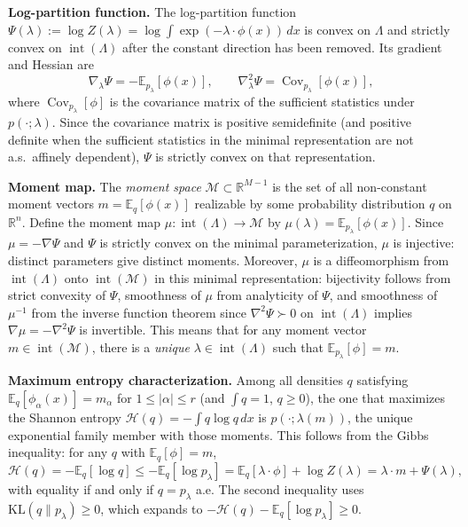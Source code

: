 \documentclass{article}
\newcommand{\R}{\mathbb{R}}
\newcommand{\E}{\mathbb{E}}
\theoremstyle{definition}
\begin{document}
\textbf{Log-partition function.}
The log-partition function $\Psi(\lambda) := \log Z(\lambda)
= \log \int \exp(-\lambda\cdot\phi(x))\,dx$ is convex on $\Lambda$
and strictly convex on $\operatorname{int}(\Lambda)$ after the constant
direction has been removed.
Its gradient and Hessian are
\begin{equation}
    \nabla_\lambda \Psi = -\E_{p_\lambda}[\phi(x)],
    \qquad
    \nabla^2_\lambda \Psi = \operatorname{Cov}_{p_\lambda}[\phi(x)],
\end{equation}
where $\operatorname{Cov}_{p_\lambda}[\phi]$ is the covariance matrix
of the sufficient statistics under $p(\cdot;\lambda)$.
Since the covariance matrix is positive semidefinite (and positive definite
when the sufficient statistics in the minimal representation are not
a.s.\ affinely dependent), $\Psi$ is strictly convex on that representation.

\textbf{Moment map.}
The \emph{moment space} $\mathcal{M} \subset \R^{M-1}$ is the set of all non-constant moment vectors $m = \E_q[\phi(x)]$ realizable by some probability distribution $q$ on $\R^n$.
Define the moment map $\mu \colon \operatorname{int}(\Lambda) \to \mathcal{M}$
by $\mu(\lambda) = \E_{p_\lambda}[\phi(x)]$.
Since $\mu = -\nabla\Psi$ and $\Psi$ is strictly convex on the minimal parameterization,
$\mu$ is injective: distinct parameters give distinct moments.
Moreover, $\mu$ is a diffeomorphism from $\operatorname{int}(\Lambda)$ onto $\operatorname{int}(\mathcal{M})$ in this minimal representation: bijectivity follows from strict convexity of $\Psi$, smoothness of $\mu$ from analyticity of $\Psi$, and smoothness of $\mu^{-1}$ from the inverse function theorem since $\nabla^2\Psi \succ 0$ on $\operatorname{int}(\Lambda)$ implies $\nabla\mu = -\nabla^2\Psi$ is invertible.
This means that for any moment vector $m \in \operatorname{int}(\mathcal{M})$,
there is a \emph{unique} $\lambda \in \operatorname{int}(\Lambda)$
such that $\E_{p_\lambda}[\phi] = m$.

\textbf{Maximum entropy characterization.}
Among all densities $q$ satisfying $\E_q[\phi_\alpha(x)] = m_\alpha$
for $1\le|\alpha| \le r$ (and $\int q = 1$, $q \ge 0$),
the one that maximizes the Shannon entropy
$\mathcal{H}(q) = -\int q \log q\, dx$ is $p(\cdot;\lambda(m))$,
the unique exponential family member with those moments.
This follows from the Gibbs inequality:
for any $q$ with $\E_q[\phi] = m$,
\begin{equation}
    \mathcal{H}(q) = -\E_q[\log q]
    \le -\E_q[\log p_\lambda]
    = \E_q[\lambda\cdot\phi] + \log Z(\lambda)
    = \lambda\cdot m + \Psi(\lambda),
\end{equation}
with equality if and only if $q = p_\lambda$ a.e.
The second inequality uses $\mathrm{KL}(q \| p_\lambda) \ge 0$,
which expands to $-\mathcal{H}(q) - \E_q[\log p_\lambda] \ge 0$.
\end{document}
